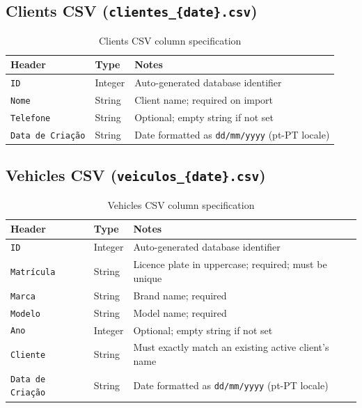 \documentclass[12pt, a4paper]{report}
\begin{document}
	\subsection*{Clients CSV (\texttt{clientes\_\{date\}.csv})}
	\begin{table}[H]
		\centering
		\begin{tabularx}{\textwidth}{l l X}
			\toprule
			\textbf{Header}         & \textbf{Type}   & \textbf{Notes} \\
			\midrule
			\texttt{ID}             & Integer & Auto-generated database identifier \\
			\texttt{Nome}           & String  & Client name; required on import \\
			\texttt{Telefone}       & String  & Optional; empty string if not set \\
			\texttt{Data de Criação} & String & Date formatted as \texttt{dd/mm/yyyy} (pt-PT locale) \\
			\bottomrule
		\end{tabularx}
		\caption{Clients CSV column specification}
	\end{table}

	\subsection*{Vehicles CSV (\texttt{veiculos\_\{date\}.csv})}
	\begin{table}[H]
		\centering
		\begin{tabularx}{\textwidth}{l l X}
			\toprule
			\textbf{Header}          & \textbf{Type}   & \textbf{Notes} \\
			\midrule
			\texttt{ID}              & Integer & Auto-generated database identifier \\
			\texttt{Matrícula}       & String  & Licence plate in uppercase; required; must be unique \\
			\texttt{Marca}           & String  & Brand name; required \\
			\texttt{Modelo}          & String  & Model name; required \\
			\texttt{Ano}             & Integer & Optional; empty string if not set \\
			\texttt{Cliente}         & String  & Must exactly match an existing active client's name \\
			\texttt{Data de Criação} & String  & Date formatted as \texttt{dd/mm/yyyy} (pt-PT locale) \\
			\bottomrule
		\end{tabularx}
		\caption{Vehicles CSV column specification}
	\end{table}
\end{document}

